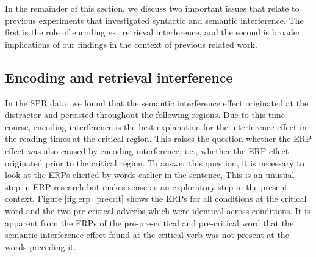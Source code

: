 \documentclass[a4paper, man, floatsintext]{apa7}
\begin{document}

In the remainder of this section, we discuss two important issues that relate to previous experiments that investigated syntactic and semantic interference. The first is the role of encoding vs.\ retrieval interference, and the second is broader implications of our findings in the context of previous related work.

\subsection{Encoding and retrieval interference}
In the SPR data, we found that the semantic interference effect originated at the distractor and persisted throughout the following regions. Due to this time course, encoding interference \parencite{Yadavetal2022,hammerly2019grammaticality} is the best explanation for the interference effect in the reading times at the critical region. This raises the question whether the ERP effect was also caused by encoding interference, i.e., whether the ERP effect originated prior to the critical region. To answer this question, it is necessary to look at the ERPs elicited by words earlier in the sentence, This is an unusual step in ERP research but makes sense as an exploratory step in the present context. Figure \ref{fig:erp_precrit} shows the ERPs for all conditions at the critical word and the two pre-critical adverbs which were identical across conditions. It is apparent from the ERPs of the pre-pre-critical and pre-critical word that the semantic interference effect found at the critical verb was not present at the words preceding it. 
\end{document}
